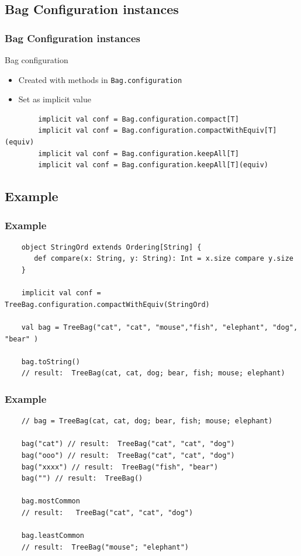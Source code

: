 \documentclass{beamer}
\begin{document}
\subsection{Bag Configuration instances} 

\begin{frame}[fragile]
	\frametitle{Bag Configuration instances}
	\begin{block}{Bag configuration}
		\begin{itemize}
			\item Created with methods in \texttt{Bag.configuration}
			\item Set as implicit value
		\end{itemize}
	\end{block}
	\begin{lstlisting}
		implicit val conf = Bag.configuration.compact[T]
		implicit val conf = Bag.configuration.compactWithEquiv[T](equiv)
		implicit val conf = Bag.configuration.keepAll[T]
		implicit val conf = Bag.configuration.keepAll[T](equiv)
	\end{lstlisting}
\end{frame}


\subsection{Example} 

\begin{frame}[fragile]
	\frametitle{Example}

	\begin{lstlisting}
	object StringOrd extends Ordering[String] {
	   def compare(x: String, y: String): Int = x.size compare y.size
	}
	
	implicit val conf = TreeBag.configuration.compactWithEquiv(StringOrd)
	
	val bag = TreeBag("cat", "cat", "mouse","fish", "elephant", "dog", "bear" )
	
	bag.toString() 
	// result:  TreeBag(cat, cat, dog; bear, fish; mouse; elephant)
	\end{lstlisting}
\end{frame}


\begin{frame}[fragile]
	\frametitle{Example}

	\begin{lstlisting}
	// bag = TreeBag(cat, cat, dog; bear, fish; mouse; elephant)
	
	bag("cat") // result:  TreeBag("cat", "cat", "dog")
	bag("ooo") // result:  TreeBag("cat", "cat", "dog")
	bag("xxxx") // result:  TreeBag("fish", "bear")
	bag("") // result:  TreeBag()

	bag.mostCommon 
	// result:   TreeBag("cat", "cat", "dog") 
	
	bag.leastCommon 
	// result:  TreeBag("mouse"; "elephant") 
	\end{lstlisting}
\end{frame}
\end{document}
